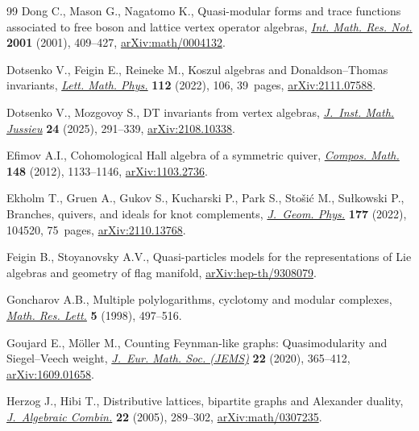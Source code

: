 \documentclass[10pt,a4paper]{amsart}
\numberwithin{equation}{section}
\theoremstyle{definition}
\begin{document}
\begin{thebibliography}{99}
Dong C., Mason G., Nagatomo K., Quasi-modular forms and trace functions
 associated to free boson and lattice vertex operator algebras,
 \href{https://doi.org/10.1155/S1073792801000204}{\textit{Int. Math. Res.
 Not.}} \textbf{2001} (2001), 409--427,
 \href{https://arxiv.org/abs/math/0004132}{arXiv:math/0004132}.

Dotsenko V., Feigin E., Reineke M., Koszul algebras and {D}onaldson--{T}homas
 invariants, \href{https://doi.org/10.1007/s11005-022-01604-4}{\textit{Lett.
 Math. Phys.}} \textbf{112} (2022), 106, 39~pages,
 \href{https://arxiv.org/abs/2111.07588}{arXiv:2111.07588}.

Dotsenko V., Mozgovoy S., D{T} invariants from vertex algebras,
 \href{https://doi.org/10.1017/S1474748024000288}{\textit{J.~Inst. Math.
 Jussieu}} \textbf{24} (2025), 291--339,
 \href{https://arxiv.org/abs/2108.10338}{arXiv:2108.10338}.

Efimov A.I., Cohomological {H}all algebra of a symmetric quiver,
 \href{https://doi.org/10.1112/S0010437X12000152}{\textit{Compos. Math.}}
 \textbf{148} (2012), 1133--1146,
 \href{https://arxiv.org/abs/1103.2736}{arXiv:1103.2736}.

Ekholm T., Gruen A., Gukov S., Kucharski P., Park S., Sto\v{s}i\'{c} M.,
 Su{\l}kowski P., Branches, quivers, and ideals for knot complements,
 \href{https://doi.org/10.1016/j.geomphys.2022.104520}{\textit{J.~Geom.
 Phys.}} \textbf{177} (2022), 104520, 75~pages,
 \href{https://arxiv.org/abs/2110.13768}{arXiv:2110.13768}.

Feigin B., Stoyanovsky A.V., Quasi-particles models for the representations of
 {L}ie algebras and geometry of flag manifold,
 \href{https://arxiv.org/abs/hep-th/9308079}{arXiv:hep-th/9308079}.

Goncharov A.B., Multiple polylogarithms, cyclotomy and modular complexes,
 \href{https://doi.org/10.4310/MRL.1998.v5.n4.a7}{\textit{Math. Res. Lett.}}
 \textbf{5} (1998), 497--516.

Goujard E., M\"{o}ller M., Counting {F}eynman-like graphs: {Q}uasimodularity
 and {S}iegel--{V}eech weight,
 \href{https://doi.org/10.4171/jems/924}{\textit{J.~Eur. Math. Soc. (JEMS)}}
 \textbf{22} (2020), 365--412,
 \href{https://arxiv.org/abs/1609.01658}{arXiv:1609.01658}.

Herzog J., Hibi T., Distributive lattices, bipartite graphs and {A}lexander
 duality,
 \href{https://doi.org/10.1007/s10801-005-4528-1}{\textit{J.~Algebraic
 Combin.}} \textbf{22} (2005), 289--302,
 \href{https://arxiv.org/abs/math/0307235}{arXiv:math/0307235}.


\end{thebibliography}
\end{document}
